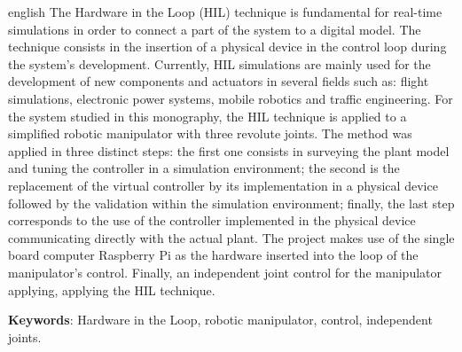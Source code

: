 \begin{resumo}[Abstract]
 \begin{otherlanguage*}{english}
  The Hardware in the Loop (HIL) technique is fundamental for real-time simulations in order to connect
  a part of the system to a digital model. The technique consists in the insertion of a physical device in
  the control loop during the system's development. Currently, HIL simulations are mainly used for the 
  development of new components and actuators in several fields such as: flight simulations, 
  electronic power systems, mobile robotics and traffic engineering. For the system studied in this monography, the HIL
  technique is applied to a simplified robotic manipulator with three revolute joints. The method was
  applied in three distinct steps: the first one consists in surveying the plant model and tuning the
  controller in a simulation environment; the second is the replacement of the virtual controller by
  its implementation in a physical device followed by the validation within the simulation environment;
  finally, the last step corresponds to the use of the controller implemented in the physical device
  communicating directly with the actual plant. The project makes use of the single board computer 
  Raspberry Pi as the hardware inserted into the loop of the manipulator's control. Finally, an independent
  joint control for the manipulator applying, applying the HIL technique.

  \vspace{\onelineskip}
 
   \noindent 
   \textbf{Keywords}: Hardware in the Loop, robotic manipulator, control, independent joints.
 \end{otherlanguage*}
\end{resumo}
